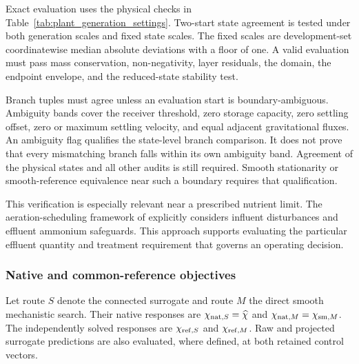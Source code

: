 Exact evaluation uses the physical checks in Table~\ref{tab:plant_generation_settings}. Two-start state agreement is tested under both generation scales and fixed state scales. The fixed scales are development-set coordinatewise median absolute deviations with a floor of one. A valid evaluation must pass mass conservation, non-negativity, layer residuals, the domain, the endpoint envelope, and the reduced-state stability test.

Branch tuples must agree unless an evaluation start is boundary-ambiguous. Ambiguity bands cover the receiver threshold, zero storage capacity, zero settling offset, zero or maximum settling velocity, and equal adjacent gravitational fluxes. An ambiguity flag qualifies the state-level branch comparison. It does not prove that every mismatching branch falls within its own ambiguity band. Agreement of the physical states and all other audits is still required. Smooth stationarity or smooth-reference equivalence near such a boundary requires that qualification.

This verification is especially relevant near a prescribed nutrient limit. The aeration-scheduling framework of \citet{Ren2026} explicitly considers influent disturbances and effluent ammonium safeguards. This approach supports evaluating the particular effluent quantity and treatment requirement that governs an operating decision.

\subsubsection{Native and common-reference objectives}

Let route $S$ denote the connected surrogate and route $M$ the direct smooth mechanistic search. Their native responses are $\chi_{{\rm nat},S}=\widehat\chi$ and $\chi_{{\rm nat},M}=\chi_{{\rm sm},M}$. The independently solved responses are $\chi_{{\rm ref},S}$ and $\chi_{{\rm ref},M}$. Raw and projected surrogate predictions are also evaluated, where defined, at both retained control vectors.

